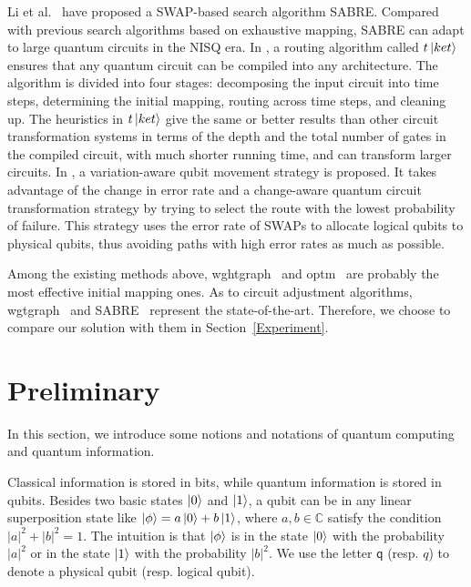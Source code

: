 \documentclass[journal]{IEEEtran}
\begin{document}
\begin{itemize}
Li et al.~\cite{Li2018} have proposed a SWAP-based search algorithm SABRE. Compared with previous search algorithms based on exhaustive mapping, SABRE
can adapt to large quantum circuits in the NISQ era. In \cite{Cowtan2019}, a routing algorithm called $t\left\vert{ket}\right\rangle$  ensures that any quantum circuit can be compiled into any architecture. The algorithm is divided into four stages: decomposing the input circuit into time steps, determining the initial mapping, routing across time steps, and cleaning up. The heuristics in $t\left\vert{ket}\right\rangle$ give the same or better results than other circuit transformation systems in terms of the depth and the total number of gates in the compiled circuit, with much shorter running time, and can transform larger circuits. In \cite{Tannu2019},  a variation-aware qubit movement strategy is proposed. It takes advantage of the change in error rate and a change-aware quantum circuit transformation strategy by trying to select the route with the lowest probability of failure. This strategy uses the error rate of  SWAPs to allocate logical qubits to physical qubits, thus avoiding paths with high error rates as much as possible.
\end{itemize}

Among the existing methods above, wghtgraph~\cite{2020Qubit} and optm~\cite{Zulehner2017} are probably the most effective initial mapping ones. As to circuit adjustment algorithms, wgtgraph~\cite{2020Qubit} and SABRE~\cite{Li2018} represent the state-of-the-art. Therefore, we choose to compare our solution with them in Section~\ref{Experiment}.


\section{Preliminary}
\label{Background}
In this section, we introduce some notions and notations of quantum computing and quantum information.

Classical information is stored in bits, while quantum information is stored in qubits. 
Besides two basic states $\left\vert{0}\right\rangle$ and $\left\vert{1}\right\rangle$,
a qubit can be in any linear superposition state like $\left\vert{\phi}\right\rangle=a\left\vert{0}\right\rangle+b\left\vert{1}\right\rangle$,
where $a,b\in \mathbb{C}$ satisfy the condition $|a|^{2}+|b|^{2}=1$.
The intuition is that $\left\vert{\phi}\right\rangle$ is in the state $\left\vert{0}\right\rangle$ with the probability $|a|^{2}$ or in the state $\left\vert{1}\right\rangle$ with the probability $|b|^{2}$.
We use the letter $\textsf{q}$ (resp. $\textit{q}$) to denote a physical qubit (resp. logical qubit).
\end{document}
